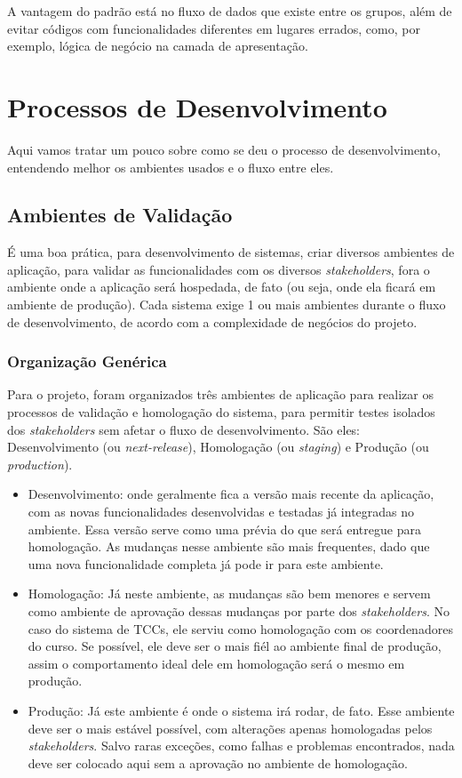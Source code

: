 A vantagem do padrão está no fluxo de dados que existe entre os grupos, além de evitar códigos com funcionalidades diferentes em lugares errados, como, por exemplo, lógica de negócio na camada de apresentação.

\section{Processos de Desenvolvimento}
Aqui vamos tratar um pouco sobre como se deu o processo de desenvolvimento, entendendo melhor os ambientes usados e o fluxo entre eles.

\subsection{Ambientes de Validação}
É uma boa prática, para desenvolvimento de sistemas, criar diversos ambientes de aplicação, para validar as funcionalidades com os diversos \textit{stakeholders}, fora o ambiente onde a aplicação será hospedada, de fato (ou seja, onde ela ficará em ambiente de produção). Cada sistema exige 1 ou mais ambientes durante o fluxo de desenvolvimento, de acordo com a complexidade de negócios do projeto.

\subsubsection{Organização Genérica}
Para o projeto, foram organizados três ambientes de aplicação para realizar os processos de validação e homologação do sistema, para permitir testes isolados dos \textit{stakeholders} sem afetar o fluxo de desenvolvimento. São eles: Desenvolvimento (ou \textit{next-release}), Homologação (ou \textit{staging}) e Produção (ou \textit{production})\cite{tracyragan2017}.

\begin{itemize}
    \item Desenvolvimento: onde geralmente fica a versão mais recente da aplicação, com as novas funcionalidades desenvolvidas e testadas já integradas no ambiente. Essa versão serve como uma prévia do que será entregue para homologação. As mudanças nesse ambiente são mais frequentes, dado que uma nova funcionalidade completa já pode ir para este ambiente.

    \item Homologação: Já neste ambiente, as mudanças são bem menores e servem como ambiente de aprovação dessas mudanças por parte dos \textit{stakeholders}. No caso do sistema de TCCs, ele serviu como homologação com os coordenadores do curso. Se possível, ele deve ser o mais fiél ao ambiente final de produção, assim o comportamento ideal dele em homologação será o mesmo em produção.

    \item Produção: Já este ambiente é onde o sistema irá rodar, de fato. Esse ambiente deve ser o mais estável possível, com alterações apenas homologadas pelos \textit{stakeholders}. Salvo raras exceções, como falhas e problemas encontrados, nada deve ser colocado aqui sem a aprovação no ambiente de homologação.
\end{itemize}

